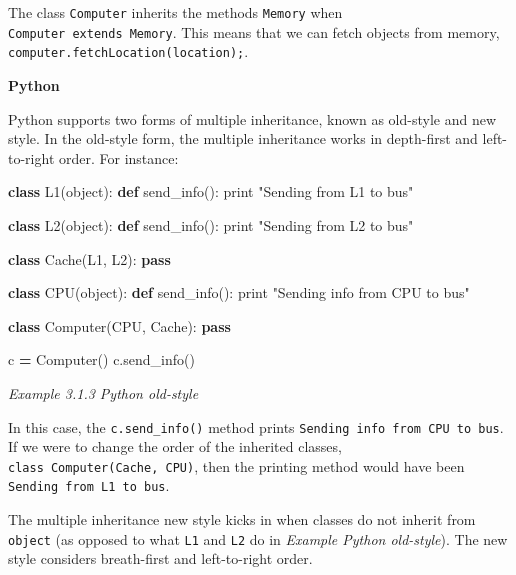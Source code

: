 \documentclass[]{article}
\newenvironment{Shaded}{\begin{snugshade}}{\end{snugshade}}
\newcommand{\KeywordTok}[1]{\textcolor[rgb]{0.13,0.29,0.53}{\textbf{{#1}}}}
\newcommand{\StringTok}[1]{\textcolor[rgb]{0.31,0.60,0.02}{{#1}}}
\newcommand{\ControlFlowTok}[1]{\textcolor[rgb]{0.13,0.29,0.53}{\textbf{{#1}}}}
\newcommand{\OperatorTok}[1]{\textcolor[rgb]{0.81,0.36,0.00}{\textbf{{#1}}}}
\newcommand{\BuiltInTok}[1]{{#1}}
\newcommand{\NormalTok}[1]{{#1}}
\begin{document}
The class \texttt{Computer} inherits the methods \texttt{Memory} when
\texttt{Computer\ extends\ Memory}. This means that we can fetch objects
from memory, \texttt{computer.fetchLocation(location);}.

\textbf{Python}

Python supports two forms of multiple inheritance, known as old-style
and new style. In the old-style form, the multiple inheritance works in
depth-first and left-to-right order. For instance:

\begin{Shaded}
\begin{Highlighting}[]
\KeywordTok{class} \NormalTok{L1(}\BuiltInTok{object}\NormalTok{):}
  \KeywordTok{def} \NormalTok{send_info():}
    \BuiltInTok{print} \StringTok{"Sending from L1 to bus"}

\KeywordTok{class} \NormalTok{L2(}\BuiltInTok{object}\NormalTok{):}
  \KeywordTok{def} \NormalTok{send_info():}
    \BuiltInTok{print} \StringTok{"Sending from L2 to bus"}

\KeywordTok{class} \NormalTok{Cache(L1, L2):}
  \ControlFlowTok{pass}

\KeywordTok{class} \NormalTok{CPU(}\BuiltInTok{object}\NormalTok{):}
  \KeywordTok{def} \NormalTok{send_info():}
    \BuiltInTok{print} \StringTok{"Sending info from CPU to bus"}

\KeywordTok{class} \NormalTok{Computer(CPU, Cache):}
  \ControlFlowTok{pass}

\NormalTok{c }\OperatorTok{=} \NormalTok{Computer()}
\NormalTok{c.send_info()}
\end{Highlighting}
\end{Shaded}

\emph{Example 3.1.3 Python old-style}

In this case, the \texttt{c.send\_info()} method prints
\texttt{Sending\ info\ from\ CPU\ to\ bus}. If we were to change the
order of the inherited classes, \texttt{class\ Computer(Cache,\ CPU)},
then the printing method would have been
\texttt{Sending\ from\ L1\ to\ bus}.

The multiple inheritance new style kicks in when classes do not inherit
from \texttt{object} (as opposed to what \texttt{L1} and \texttt{L2} do
in \emph{Example Python old-style}). The new style considers
breath-first and left-to-right order.
\end{document}
